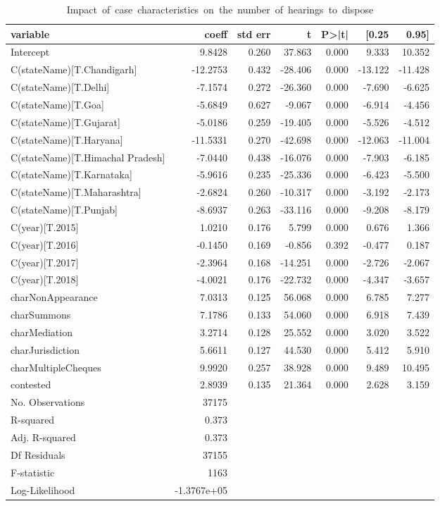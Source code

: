 {\footnotesize
  \begin{longtable}{@{}lrrrrrr@{}}
\caption{\mbox{Impact of case characteristics on the number of hearings to dispose}}
\label{tab:hearings_reg}\\
\toprule
variable & coeff & std err & t & P>|t| & [0.25 & 0.95] \\\midrule
\endhead
%
Intercept & 9.8428 & 0.260 & 37.863 & 0.000 & 9.333 & 10.352 \\
C(stateName)[T.Chandigarh] & -12.2753 & 0.432 & -28.406 & 0.000 & -13.122 & -11.428 \\
C(stateName)[T.Delhi] & -7.1574 & 0.272 & -26.360 & 0.000 & -7.690 & -6.625 \\
C(stateName)[T.Goa] & -5.6849 & 0.627 & -9.067 & 0.000 & -6.914 & -4.456 \\
C(stateName)[T.Gujarat] & -5.0186 & 0.259 & -19.405 & 0.000 & -5.526 & -4.512 \\
C(stateName)[T.Haryana] & -11.5331 & 0.270 & -42.698 & 0.000 & -12.063 & -11.004 \\
C(stateName)[T.Himachal Pradesh] & -7.0440 & 0.438 & -16.076 & 0.000 & -7.903 & -6.185 \\
C(stateName)[T.Karnataka] & -5.9616 & 0.235 & -25.336 & 0.000 & -6.423 & -5.500 \\
C(stateName)[T.Maharashtra] & -2.6824 & 0.260 & -10.317 & 0.000 & -3.192 & -2.173 \\
C(stateName)[T.Punjab] & -8.6937 & 0.263 & -33.116 & 0.000 & -9.208 & -8.179 \\
C(year)[T.2015] & 1.0210 & 0.176 & 5.799 & 0.000 & 0.676 & 1.366 \\
C(year)[T.2016] & -0.1450 & 0.169 & -0.856 & 0.392 & -0.477 & 0.187 \\
C(year)[T.2017] & -2.3964 & 0.168 & -14.251 & 0.000 & -2.726 & -2.067 \\
C(year)[T.2018] & -4.0021 & 0.176 & -22.732 & 0.000 & -4.347 & -3.657 \\
charNonAppearance & 7.0313 & 0.125 & 56.068 & 0.000 & 6.785 & 7.277 \\
charSummons & 7.1786 & 0.133 & 54.060 & 0.000 & 6.918 & 7.439 \\
charMediation & 3.2714 & 0.128 & 25.552 & 0.000 & 3.020 & 3.522 \\
charJurisdiction & 5.6611 & 0.127 & 44.530 & 0.000 & 5.412 & 5.910 \\
charMultipleCheques & 9.9920 & 0.257 & 38.928 & 0.000 & 9.489 & 10.495 \\
contested & 2.8939 & 0.135 & 21.364 & 0.000 & 2.628 & 3.159\\
\bottomrule
No. Observations & 37175 & & & & &\\
R-squared & 0.373 & & & & & \\
Adj. R-squared& 0.373& & & & & \\
Df Residuals& 37155 & & & & &\\
F-statistic & 1163 & & & & & \\
Log-Likelihood & -1.3767e+05 & & & & & \\
\bottomrule
\end{longtable}}

